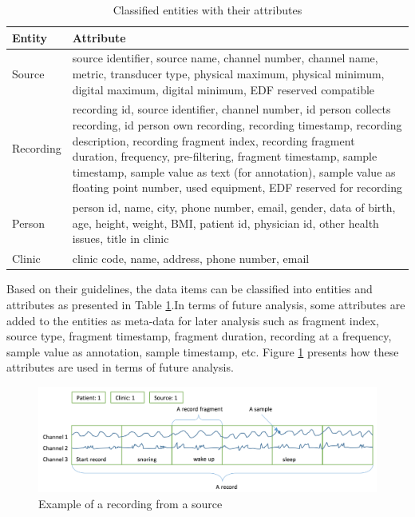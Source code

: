\begin{table}[ht]
\begin{center}
\begin{tabular}{ |p{3cm}||p{10cm}|}
 \hline
 Entity& Attribute\\
 \hline
 Source& source identifier, source name, channel number, channel name, metric, transducer type, physical maximum, physical minimum, digital maximum, digital minimum, EDF reserved compatible\\
 \hline
 Recording& recording id, source identifier, channel number, id person collects recording, id person own recording, recording timestamp, recording description, recording fragment index, recording fragment duration, frequency, pre-filtering, fragment timestamp, sample timestamp, sample value as text (for annotation), sample value as floating point number, used equipment, EDF reserved for recording\\
 \hline
 Person& person id, name, city, phone number, email, gender, data of birth, age, height, weight, BMI, patient id, physician id, other health issues, title in clinic\\
 \hline
 Clinic& clinic code, name, address, phone number, email\\
 \hline
\end{tabular}
\end{center}
\caption{Classified entities with their attributes}
\label{tab:entitiesAttributes}
\end{table}
Based on their guidelines, the data items can be classified into entities and attributes as presented in Table \ref{tab:entitiesAttributes}.In terms of future analysis, some attributes are added to the entities as meta-data for later analysis such as fragment index, source type, fragment timestamp, fragment duration, recording at a frequency, sample value as annotation, sample timestamp, etc. Figure \ref{fig:Figures/RecordingExample} presents how these attributes are used in terms of future analysis.
\begin{figure}[ht]
    \centering
    \includegraphics[width=1.0\textwidth]{Figures/ARecord.png}
    \caption{Example of a recording from a source}
    \label{fig:Figures/RecordingExample}
\end{figure}
